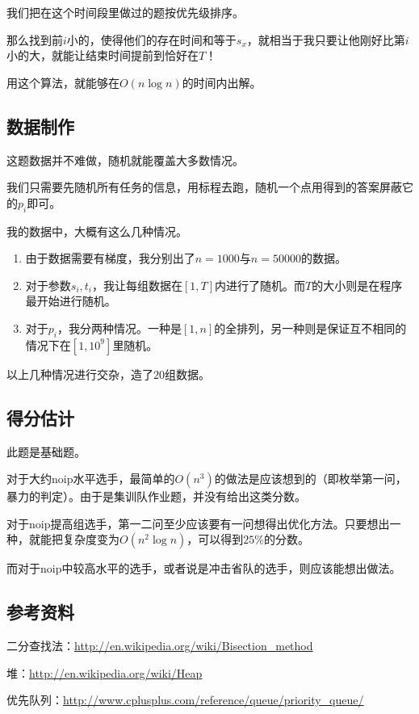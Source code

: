\documentclass{ctexart}
\begin{document}
			我们把在这个时间段里做过的题按优先级排序。

			那么找到前$i$小的，使得他们的存在时间和等于$s_x$，就相当于我只要让他刚好比第$i$小的大，就能让结束时间提前到恰好在$T$！

			用这个算法，就能够在$O(n \log n)$的时间内出解。
			\subsection{数据制作}
			这题数据并不难做，随机就能覆盖大多数情况。

			我们只需要先随机所有任务的信息，用标程去跑，随机一个点用得到的答案屏蔽它的$p_i$即可。

			我的数据中，大概有这么几种情况。

			\begin{enumerate}
				\item 由于数据需要有梯度，我分别出了$n=1000$与$n=50000$的数据。
				\item 对于参数$s_i,t_i$，我让每组数据在$[1,T]$内进行了随机。而$T$的大小则是在程序最开始进行随机。
				\item 对于$p_i$，我分两种情况。一种是$[1,n]$的全排列，另一种则是保证互不相同的情况下在$[1,10^9]$里随机。
			\end{enumerate}

			以上几种情况进行交杂，造了$20$组数据。
			\subsection{得分估计}
			此题是基础题。

			对于大约noip水平选手，最简单的$O(n^3)$的做法是应该想到的（即枚举第一问，暴力的判定）。由于是集训队作业题，并没有给出这类分数。
			
			对于noip提高组选手，第一二问至少应该要有一问想得出优化方法。只要想出一种，就能把复杂度变为$O(n^2 \log n)$，可以得到$25\%$的分数。

			而对于noip中较高水平的选手，或者说是冲击省队的选手，则应该能想出做法。
		\subsection{参考资料}
			二分查找法：\href{http://en.wikipedia.org/wiki/Bisection_method}{http://en.wikipedia.org/wiki/Bisection\_method}

			堆：\href{http://en.wikipedia.org/wiki/Heap}{http://en.wikipedia.org/wiki/Heap}

			优先队列：\href{http://www.cplusplus.com/reference/queue/priority_queue/}{http://www.cplusplus.com/reference/queue/priority\_queue/}
\end{document}

